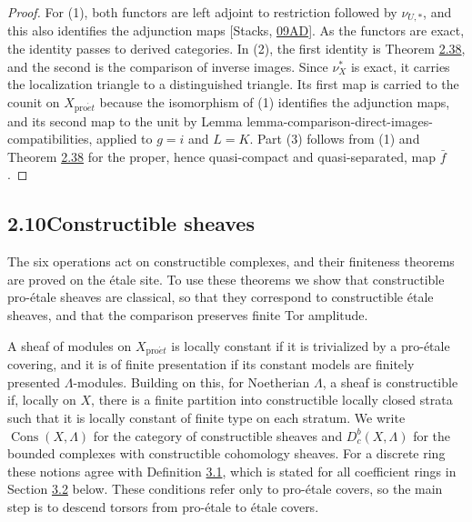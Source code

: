 \documentclass[11pt]{article}
\providecommand{\Cons}{}\renewcommand{\Cons}{\operatorname{Cons}}
\providecommand{\Dbc}{}\renewcommand{\Dbc}{D^b_c}
\begin{document}
\begin{proof}[{Proof}]\label{bp120}%
For (1), both functors are left adjoint to restriction followed by \(\nu_{U,*}\), and this also identifies the adjunction maps [Stacks, \href{https://stacks.math.columbia.edu/tag/09AD}{09AD}]. As the functors are exact, the identity passes to derived categories. In (2), the first identity is Theorem \hyperref[bp113]{2.38}, and the second is the comparison of inverse images. Since \(\nu_X^*\) is exact, it carries the localization triangle to a distinguished triangle. Its first map is carried to the counit on \(X_{\mathrm{pro}\acute{e}t}\) because the isomorphism of (1) identifies the adjunction maps, and its second map to the unit by Lemma lemma-comparison-direct-images-compatibilities, applied to \(g=i\) and \(L=K\). Part (3) follows from (1) and Theorem \hyperref[bp113]{2.38} for the proper, hence quasi-compact and quasi-separated, map \(\bar f\).
\end{proof}


\subsection*{\texorpdfstring{2.10\quad Constructible sheaves}{2.10 Constructible sheaves}}
\label{bp121}%
\label{bp122}%
The six operations act on constructible complexes, and their finiteness theorems are proved on the étale site. To use these theorems we show that constructible pro-étale sheaves are classical, so that they correspond to constructible étale sheaves, and that the comparison preserves finite Tor amplitude.

A sheaf of modules on \(X_{\mathrm{pro}\acute{e}t}\) is locally constant if it is trivialized by a pro-étale covering, and it is of finite presentation if its constant models are finitely presented \(\Lambda\)-modules. Building on this, for Noetherian \(\Lambda\), a sheaf is constructible if, locally on \(X\), there is a finite partition into constructible locally closed strata such that it is locally constant of finite type on each stratum. We write \(\Cons(X,\Lambda)\) for the category of constructible sheaves and \(\Dbc(X,\Lambda)\) for the bounded complexes with constructible cohomology sheaves. For a discrete ring these notions agree with Definition \hyperref[bp199]{3.1}, which is stated for all coefficient rings in Section \hyperref[bp197]{3.2} below. These conditions refer only to pro-étale covers, so the main step is to descend torsors from pro-étale to étale covers.
\end{document}
